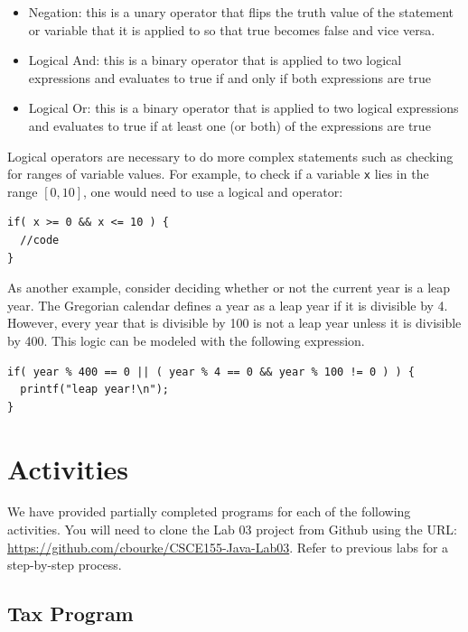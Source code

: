 \documentclass[12pt]{scrartcl}
\begin{document}
\begin{itemize}
  \item Negation: this is a unary operator that flips the truth value of 
  	the statement or variable that it is applied to so that true becomes 
	false and vice versa.
  \item Logical And: this is a binary operator that is applied to two logical 
	expressions and evaluates to true if and only if both expressions are 
	true
  \item Logical Or: this is a binary operator that is applied to two logical 
	expressions and evaluates to true if at least one (or both) of the 
	expressions are true
\end{itemize}
	
Logical operators are necessary to do more complex statements such as 
checking for ranges of variable values.  For example, to check if a variable 
\texttt{x} lies in the range $[0, 10]$, one would need to use a logical and operator:

\begin{verbatim}
if( x >= 0 && x <= 10 ) { 
  //code
}
\end{verbatim}

As another example, consider deciding whether or not the current year is 
a leap year.  The Gregorian calendar defines a year as a leap year if it is 
divisible by 4.  However, every year that is divisible by 100 is not a leap year 
unless it is divisible by 400.  This logic can be modeled with the following 
expression.

\begin{verbatim}
if( year % 400 == 0 || ( year % 4 == 0 && year % 100 != 0 ) ) {
  printf("leap year!\n");
}
\end{verbatim}

\section{Activities}

We have provided partially completed programs for each of the following 
activities.  You will need to clone the Lab 03 project from Github using the URL:
\url{https://github.com/cbourke/CSCE155-Java-Lab03}.  Refer to previous
labs for a step-by-step process.

\subsection{Tax Program}
\end{document}

